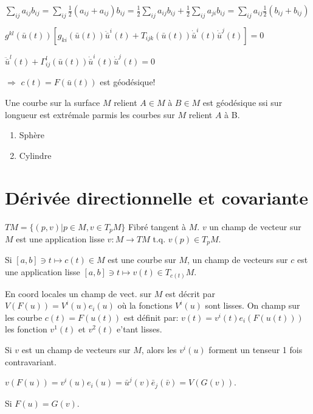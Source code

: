 $∑_{ij}a_{ij}b_{ij}=∑_{ij}\frac 12 (a_{ij}+a_{ij})b_{ij}=\frac 12 ∑_{ij}a_{ij}b_{ij}+\frac 12 ∑_{ij}a_{ji}b_{ij}=∑_{ij}a_{ij}\frac 12(b_{ij}+b_{ij})$

$g^{kl}(\bar u(t))[g_{ki}(\bar u(t))\ddot\bar u^i(t)+T_{ijk}(\bar u(t))\dot\bar u^i(t)\dot\bar u^j(t)]=0$

$\ddot\bar u^l(t)+Γ_{ij}^l(\bar u(t))\dot\bar u^i(t)\dot\bar u^j(t)=0$

$\Rightarrow$ $c(t)=F(\bar u(t))$ est géodésique! 

\begin{theorem}[III.19]
	Une courbe sur la surface $M$ relient $A\in M$ à $B\in M$ est géodésique ssi sur longueur est extrémale parmis les courbes sur $M$ relient $A$ à B.
\end{theorem}

\begin{example}
	\begin{enumerate}
		\item Sphère
		\item Cylindre
	\end{enumerate}
\end{example}

\section{Dérivée  directionnelle et covariante} %
\label{sec:derivee_directionnelle_et_covariante}
\begin{definition}
	$TM=\{(p,v)|p\in M, v\in T_p M\}$ Fibré tangent à $M$. $v$ un champ de vecteur sur $M$ est une application lisse $v:M\rightarrow TM$ t.q. $v(p)\in T_pM$.
\end{definition}

Si $[a,b]\ni t\mapsto c(t)\in M$ est une courbe sur $M$, un champ de vecteurs sur $c$ est une application lisse $[a,b]\ni t\mapsto v(t)\in T_{c(t)}M$.

En coord locales un champ de vect. sur $M$ est décrit par $V(F(u))=V^i(u)e_i(u)$ où la fonctions $V^i(u)$ sont lisses. On champ sur les courbe $c(t)=F(u(t))$ est définit par:
$v(t)=v^i(t)e_i(F(u(t)))$ les fonction $v^1(t)$ et $v^2(t)$ e'tant lisses.

Si $v$ est un champ de vecteurs sur $M$, alors les $v^i(u)$ forment un tenseur 1 fois contravariant.

$v(F(u))=v^i(u)e_i(u)=\bar u^j(v)\bar e_j(\bar v)=V(G(v))$.

Si $F(u)=G(v)$.

